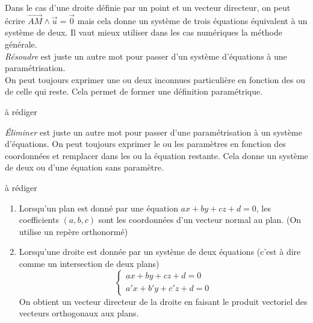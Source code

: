 Dans le cas d'une droite définie par un point et un vecteur directeur, on peut écrire $\overrightarrow{AM}\wedge \overrightarrow u = \overrightarrow 0$ mais cela donne un système de trois équations équivalent à un système de deux. Il vaut mieux utiliser dans les cas numériques la méthode générale.\\
\emph{Résoudre} est juste un autre mot pour passer d'un système d'équations à une paramétrisation.\\
On peut toujours exprimer une ou deux inconnues particulière en fonction des ou de celle qui reste. Cela permet de former une définition paramétrique.
\begin{exple}
 à rédiger
\end{exple}

 \emph{\'Eliminer} est juste un autre mot pour passer d'une paramétrisation à un système d'équations.
On peut toujours exprimer le ou les paramètres en fonction des coordonnées et remplacer dans les ou la équation restante. Cela donne un système de deux ou d'une équation sans paramètre.
\begin{exple}
 à rédiger
\end{exple}
\begin{rems}
 \begin{enumerate}
  \item Lorsqu'un plan est donné par une équation $ax+by+cz+d=0$, les coefficients $(a,b,c)$ sont les coordonnées d'un vecteur normal au plan. (On utilise un repère orthonormé)
  \item Lorsqu'une droite est donnée par un système de deux équations (c'est à dire comme un intersection de deux plans)
\begin{displaymath}
 \left\lbrace 
\begin{aligned}
 ax+by+cz+d=0 \\
a'x+b'y+c'z+d=0
\end{aligned}
\right. 
\end{displaymath}
On obtient un vecteur directeur de la droite en faisant le produit vectoriel des vecteurs orthogonaux aux plans.
 \end{enumerate}

\end{rems}

